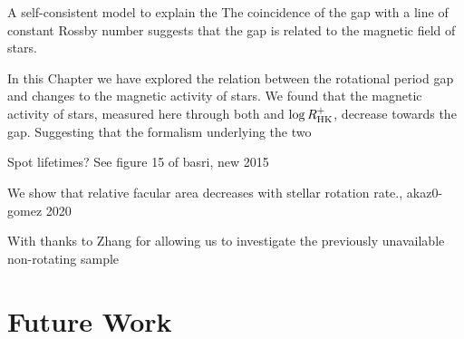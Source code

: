 A self-consistent model to explain the
The coincidence of the gap with a line of constant Rossby number suggests that the gap is related to the magnetic field of stars.







In this Chapter we have explored the relation between the rotational period gap and changes to the magnetic activity of stars.
We found that the magnetic activity of stars, measured here through both \rper{} and  $\log R^{+}_{\rm{HK}}$, decrease towards the gap.
Suggesting that the formalism underlying the two


Spot lifetimes? See figure 15 of basri, new 2015


We show that relative facular area decreases
with stellar rotation rate., akaz0-gomez 2020




With thanks to Zhang for allowing us to investigate the previously unavailable non-rotating sample





\section{Future Work}


